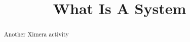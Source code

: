 \documentclass{ximera}
\title{What Is A System}
\begin{document}
\begin{abstract}
Another Ximera activity
\end{abstract}
\maketitle
\end{document}
